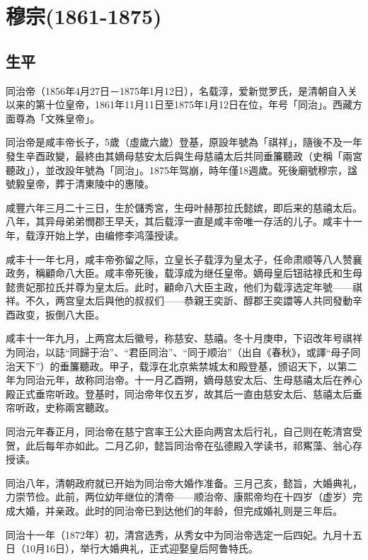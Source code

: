 
\section{穆宗\tiny(1861-1875)}

\subsection{生平}

同治帝（1856年4月27日－1875年1月12日），名载淳，爱新觉罗氏，是清朝自入关以来的第十位皇帝，1861年11月11日至1875年1月12日在位，年号「同治」。西藏方面尊為「文殊皇帝」。

同治帝是咸丰帝长子，5歲（虛歲六歲）登基，原設年號為「祺祥」，隨後不及一年發生辛酉政變，最終由其嫡母慈安太后與生母慈禧太后共同垂簾聽政（史稱「兩宮聽政」），並改設年號為「同治」。1875年驾崩，時年僅18週歲。死後廟號穆宗，諡號毅皇帝，葬于清東陵中的惠陵。

咸豐六年三月二十三日，生於儲秀宮，生母叶赫那拉氏懿嫔，即后来的慈禧太后。八年，其异母弟弟憫郡王早夭，其后载淳一直是咸丰帝唯一存活的儿子。咸丰十一年，载淳开始上学，由编修李鸿藻授读。

咸丰十一年七月，咸丰帝弥留之际，立皇长子载淳为皇太子，任命肃顺等八人赞襄政务，稱顧命八大臣。咸丰帝死後，载淳成为继任皇帝。嫡母皇后钮祜禄氏和生母懿贵妃那拉氏并尊为皇太后。此时，顧命八大臣主政，他们为载淳选定年號——祺祥。不久，两宫皇太后與他的叔叔们——恭親王奕訢、醇郡王奕譞等人共同發動辛酉政变，扳倒八大臣。

咸丰十一年九月，上两宫太后徽号，称慈安、慈禧。冬十月庚申，下诏改年号祺祥为同治，以誌“同歸于治”、“君臣同治”、“同于顺治”（出自《春秋》，或譯“母子同治天下”）的垂簾聽政。甲子，载淳在北京紫禁城太和殿登基，颁诏天下，以第二年为同治元年，故称同治帝。十一月乙酉朔，嫡母慈安太后、生母慈禧太后在养心殿正式垂帘听政。登基时，同治帝年仅五岁，故其后一直由慈安太后、慈禧太后垂帘听政，史称兩宮聽政。

同治元年春正月，同治帝在慈宁宫率王公大臣向两宫太后行礼，自己则在乾清宫受贺，此后每年亦如此。二月乙卯，懿旨同治帝在弘德殿入学读书，祁寯藻、翁心存授读。

同治八年，清朝政府就已开始为同治帝大婚作准备。三月己亥，懿旨，大婚典礼，力崇节俭。此前，两位幼年继位的清帝——顺治帝、康熙帝均在十四岁（虚岁）完成大婚，并亲政。此时的同治帝已到达他们的年龄，但完成婚礼则是三年后。

同治十一年（1872年）初，清宫选秀，从秀女中为同治帝选定一后四妃。九月十五日（10月16日），举行大婚典礼，正式迎娶皇后阿鲁特氏。

